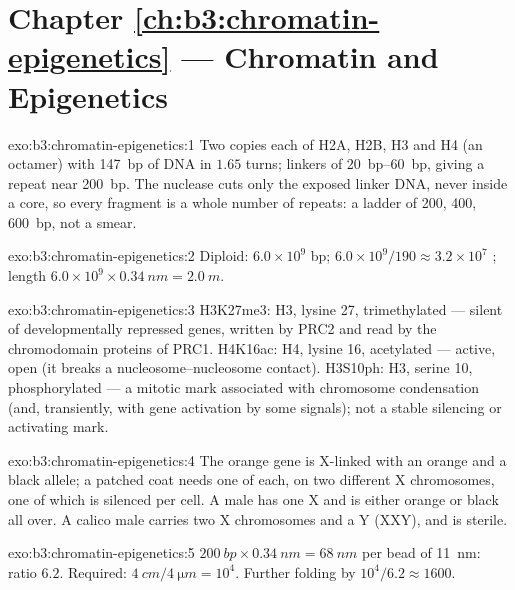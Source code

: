 \section*{Chapter \ref{ch:b3:chromatin-epigenetics} --- Chromatin and Epigenetics}

\begin{solution}{exo:b3:chromatin-epigenetics:1}
Two copies each of H2A, H2B, H3 and H4 (an octamer) with \qty{147}{bp}
of DNA in $1.65$ turns; linkers of \qtyrange{20}{60}{bp}, giving a
repeat near \qty{200}{bp}. The nuclease cuts only the exposed linker
DNA, never inside a core, so every fragment is a whole number of
repeats: a ladder of \num{200}, \num{400}, \qty{600}{bp}, not a smear.
\end{solution}

\begin{solution}{exo:b3:chromatin-epigenetics:2}
Diploid: $6.0\times 10^{9}$ bp; $6.0\times 10^{9}/190 \approx
3.2\times 10^{7}$ ; length $6.0\times 10^{9}\times
\qty{0.34}{nm} = \qty{2.0}{m}$.
\end{solution}

\begin{solution}{exo:b3:chromatin-epigenetics:3}
H3K27me3:  H3, lysine 27, trimethylated --- silent  of
developmentally repressed genes, written by PRC2 and read by the
chromodomain proteins of PRC1. H4K16ac: H4, lysine 16, acetylated ---
active, open  (it breaks a nucleosome--nucleosome contact).
H3S10ph: H3, serine 10, phosphorylated --- a mitotic mark associated
with chromosome condensation (and, transiently, with gene activation
by some signals); not a stable silencing or activating mark.
\end{solution}

\begin{solution}{exo:b3:chromatin-epigenetics:4}
The orange gene is X-linked with an orange and a black allele; a
patched coat needs one of each, on two different X chromosomes, one of
which is silenced per cell. A male has one X and is either orange or
black all over. A calico male carries two X chromosomes and a Y (XXY),
and is sterile.
\end{solution}

\begin{solution}{exo:b3:chromatin-epigenetics:5}
$\qty{200}{bp}\times \qty{0.34}{nm} = \qty{68}{nm}$ per bead of
\qty{11}{nm}: ratio $6.2$. Required: $\qty{4}{cm}/\qty{4}{\micro m} =
10^{4}$. Further folding by $10^{4}/6.2 \approx 1600$.
\end{solution}

